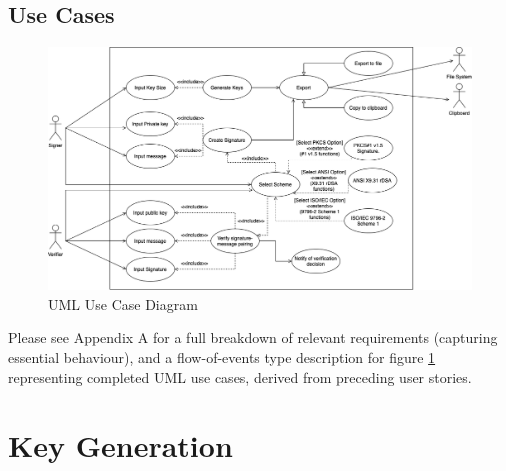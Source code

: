 \documentclass[]{final_report}
\theoremstyle{definition}
\begin{document}
\subsection{Use Cases}
\begin{figure}[H]
    \centering
    \includegraphics[scale=0.48]{POC_USE-CASE.png}
    \caption{UML Use Case Diagram}
    \label{fig:uc}
\end{figure}

Please see Appendix A for a full breakdown of relevant requirements (capturing essential behaviour), and a flow-of-events type description for figure \ref{fig:uc} representing completed UML use cases, derived from preceding user stories.



\section{Key Generation}
\end{document}
